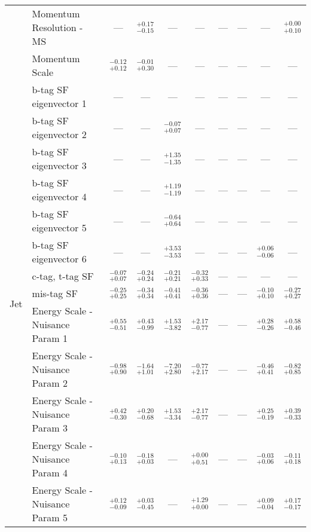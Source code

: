 \begin{tabular}{|cl||cccccc|c||c|}
\cline{2-10}
&Momentum Resolution - MS & --- &  $^{+0.17}_{-0.15}$  & --- & --- & --- & --- & --- &  $^{+0.00}_{+0.10}$ \\ 
\cline{2-10}
&Momentum Scale &  $^{-0.12}_{+0.12}$  &  $^{-0.01}_{+0.30}$  & --- & --- & --- & --- & --- & ---\\ 
\hline
\multirow{27}{*}{Jet}
&b-tag SF eigenvector 1 & --- & --- & --- & --- & --- & --- & --- & ---\\ 
\cline{2-10}
&b-tag SF eigenvector 2 & --- & --- &  $^{-0.07}_{+0.07}$  & --- & --- & --- & --- & ---\\ 
\cline{2-10}
&b-tag SF eigenvector 3 & --- & --- &  $^{+1.35}_{-1.35}$  & --- & --- & --- & --- & ---\\ 
\cline{2-10}
&b-tag SF eigenvector 4 & --- & --- &  $^{+1.19}_{-1.19}$  & --- & --- & --- & --- & ---\\ 
\cline{2-10}
&b-tag SF eigenvector 5 & --- & --- &  $^{-0.64}_{+0.64}$  & --- & --- & --- & --- & ---\\ 
\cline{2-10}
&b-tag SF eigenvector 6 & --- & --- &  $^{+3.53}_{-3.53}$  & --- & --- & --- &  $^{+0.06}_{-0.06}$  & ---\\ 
\cline{2-10}
&c-tag, t-tag SF &  $^{-0.07}_{+0.07}$  &  $^{-0.24}_{+0.24}$  &  $^{-0.21}_{+0.21}$  &  $^{-0.32}_{+0.33}$  & --- & --- & --- & ---\\ 
\cline{2-10}
&mis-tag SF &  $^{-0.25}_{+0.25}$  &  $^{-0.34}_{+0.34}$  &  $^{-0.41}_{+0.41}$  &  $^{-0.36}_{+0.36}$  & --- & --- &  $^{-0.10}_{+0.10}$  &  $^{-0.27}_{+0.27}$ \\ 
\cline{2-10}
&Energy Scale - Nuisance Param 1 &  $^{+0.55}_{-0.51}$  &  $^{+0.43}_{-0.99}$  &  $^{+1.53}_{-3.82}$  &  $^{+2.17}_{-0.77}$  & --- & --- &  $^{+0.28}_{-0.26}$  &  $^{+0.58}_{-0.46}$ \\ 
\cline{2-10}
&Energy Scale - Nuisance Param 2 &  $^{-0.98}_{+0.90}$  &  $^{-1.64}_{+1.01}$  &  $^{-7.20}_{+2.80}$  &  $^{-0.77}_{+2.17}$  & --- & --- &  $^{-0.46}_{+0.41}$  &  $^{-0.82}_{+0.85}$ \\ 
\cline{2-10}
&Energy Scale - Nuisance Param 3 &  $^{+0.42}_{-0.30}$  &  $^{+0.20}_{-0.68}$  &  $^{+1.53}_{-3.34}$  &  $^{+2.17}_{-0.77}$  & --- & --- &  $^{+0.25}_{-0.19}$  &  $^{+0.39}_{-0.33}$ \\ 
\cline{2-10}
&Energy Scale - Nuisance Param 4 &  $^{-0.10}_{+0.13}$  &  $^{-0.18}_{+0.03}$  & --- &  $^{+0.00}_{+0.51}$  & --- & --- &  $^{-0.03}_{+0.06}$  &  $^{-0.11}_{+0.18}$ \\ 
\cline{2-10}
&Energy Scale - Nuisance Param 5 &  $^{+0.12}_{-0.09}$  &  $^{+0.03}_{-0.45}$  & --- &  $^{+1.29}_{+0.00}$  & --- & --- &  $^{+0.09}_{-0.04}$  &  $^{+0.17}_{-0.17}$ \\ 

\end{tabular}
